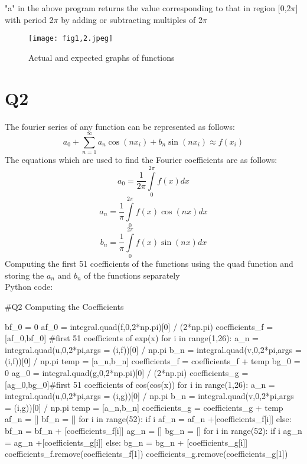 \documentclass[12pt, a4paper]{report}
\begin{document}
"a" in the above program returns the value corresponding to that in region [0,2$\pi$] with period 2$\pi$ by adding or subtracting multiples of 2$\pi$\\
\begin{figure}[H]
	\centering
	\texttt{[image: fig1,2.jpeg]}  %
	\caption{Actual and expected graphs of functions}
	\label{fig:Q4 }
\end{figure} 

\section*{Q2}  
The fourier series of any function can be represented as follows:
\begin{equation}
    a_{0} + \sum\limits_{n=1}^{\infty} {{a_{n}\cos(nx_{i})+b_{n}\sin(nx_{i})}} \approx f(x_{i})             
    \end{equation} 
The equations which are used to find the Fourier coefficients are as follows:
\begin{equation}
         a_{0} = \frac{1}{2\pi}\int\limits_{0}^{2\pi} f(x)dx                
\end{equation} 
\begin{equation}
         a_{n} = \frac{1}{\pi}\int\limits_{0}^{2\pi} f(x)\cos(nx)dx         
\end{equation}
\begin{equation}
         b_{n} = \frac{1}{\pi}\int\limits_{0}^{2\pi} f(x)\sin(nx)dx     
\end{equation}
Computing the first 51 coefficients of the functions using the quad function and storing the $a_n$ and $b_n$ of the functions separately\\ 

Python code:
\begin{py_code}
    #Q2 Computing the Coefficients

bf_0 = 0
af_0 = integral.quad(f,0,2*np.pi)[0] / (2*np.pi)
coefficients_f = [af_0,bf_0] #first 51 coefficients of exp(x) 
for i in range(1,26):
    a_n = integral.quad(u,0,2*pi,args = (i,f))[0] / np.pi
    b_n = integral.quad(v,0,2*pi,args = (i,f))[0] / np.pi
    temp = [a_n,b_n]
    coefficients_f = coefficients_f + temp
bg_0 = 0
ag_0 = integral.quad(g,0,2*np.pi)[0] / (2*np.pi)
coefficients_g = [ag_0,bg_0]#first 51 coefficients of cos(cos(x))
for i in range(1,26):
    a_n = integral.quad(u,0,2*pi,args = (i,g))[0] / np.pi
    b_n = integral.quad(v,0,2*pi,args = (i,g))[0] / np.pi
    temp = [a_n,b_n]
    coefficients_g = coefficients_g + temp   
af_n = []
bf_n = []
for i in range(52):
    if i%
        af_n = af_n +[coefficients_f[i]]
    else:
        bf_n = bf_n + [coefficients_f[i]]
ag_n = []
bg_n = []
for i in range(52):
    if i%
        ag_n = ag_n +[coefficients_g[i]]
    else:
        bg_n = bg_n + [coefficients_g[i]]        
coefficients_f.remove(coefficients_f[1])   
coefficients_g.remove(coefficients_g[1])   

\end{py_code}
\end{document}
